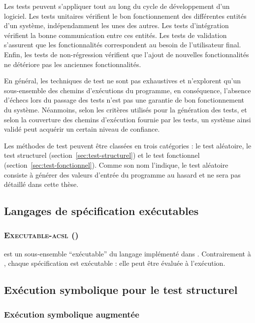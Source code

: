 Les tests peuvent s’appliquer tout au long du cycle de développement d’un
logiciel. Les tests unitaires vérifient le bon fonctionnement des différentes
entités d’un système, indépendamment les unes des autres. Les tests
d'intégration vérifient la bonne communication entre ces entités. Les tests de
validation s'assurent que les fonctionnalités correspondent au besoin de
l’utilisateur final. Enfin, les tests de non-régression vérifient que l'ajout de
nouvelles fonctionnalités ne détériore pas les anciennes fonctionnalités.

En général, les techniques de test ne sont pas exhaustives et n'explorent qu'un
sous-ensemble des chemins d'exécutions du programme, en conséquence, l’absence
d’échecs lors du passage des tests n’est pas une garantie de bon fonctionnement
du système. Néanmoins, selon les critères utilisés pour la génération des
tests, et selon la couverture des chemins d'exécution fournie par les tests, un
système ainsi validé peut acquérir un certain niveau de confiance.

Les méthodes de test peuvent être classées en trois catégories : le test
aléatoire, le test structurel (section~\ref{sec:test-structurel}) et le test
fonctionnel (section~\ref{sec:test-fonctionnel}). Comme son nom l'indique, le
test aléatoire consiste à générer des valeurs d'entrée du programme au hasard et
ne sera pas détaillé dans cette thèse.


\subsection{Langages de spécification exécutables}
\label{sec:execspeclang}


\subsubsection*{\textsc{Executable-acsl} (\eacsl)}

\eacsl est un sous-ensemble ``exécutable'' du langage \acsl
implémenté dans \framac. Contrairement à \acsl, chaque
spécification \eacsl est exécutable : elle peut être évaluée à
l'exécution.


\subsection{Exécution symbolique pour le test structurel}
\label{sec:exec-sym}



\subsubsection*{Exécution symbolique augmentée}



